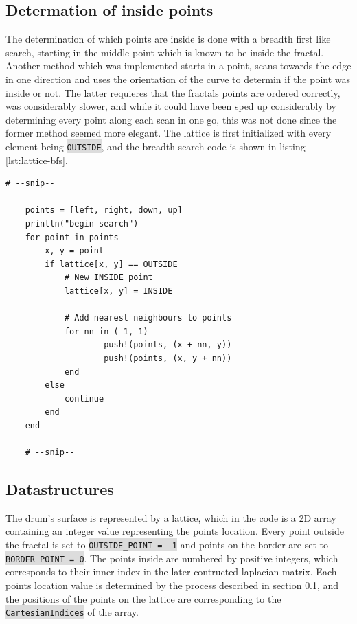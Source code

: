 \documentclass{article}
\begin{document}
\subsection{Determation of inside points}\label{code:determine-inside}
The determination of which points are inside is done with a breadth first like search, starting in the middle point which is known to be inside the fractal. Another method which was implemented starts in a point, scans towards the edge in one direction and uses the orientation of the curve to determin if the point was inside or not. The latter requieres that the fractals points are ordered correctly, was considerably slower, and while it could have been sped up considerably by determining every point along each scan in one go, this was not done
since the former method seemed more elegant. The lattice is first initialized with every element being \colorbox{gainsboro}{\lstinline{OUTSIDE}}, and the breadth search code is shown in listing \ref{lst:lattice-bfs}.\\

\begin{lstlisting}[label=lst:lattice-bfs]
    # --snip--    

    points = [left, right, down, up] 
    println("begin search")
    for point in points
        x, y = point
        if lattice[x, y] == OUTSIDE
            # New INSIDE point
            lattice[x, y] = INSIDE

            # Add nearest neighbours to points
            for nn in (-1, 1)
                    push!(points, (x + nn, y)) 
                    push!(points, (x, y + nn))
            end
        else
            continue
        end
    end 

    # --snip--    
\end{lstlisting}

\subsection{Datastructures}
The drum's surface is represented by a lattice, which in the code is a 2D array containing an integer value representing the points location. Every point outside the fractal is set to \colorbox{gainsboro}{\lstinline{OUTSIDE_POINT = -1}} and points on the border are set to \colorbox{gainsboro}{\lstinline{BORDER_POINT = 0}}. The points inside are numbered by positive integers, which corresponds to their inner index in the
later contructed laplacian matrix. Each points location value is determined by the process described in section \ref{code:determine-inside}, and the positions of the
points on the lattice are corresponding to the \colorbox{gainsboro}{\lstinline{CartesianIndices}} of the array.
\end{document}
